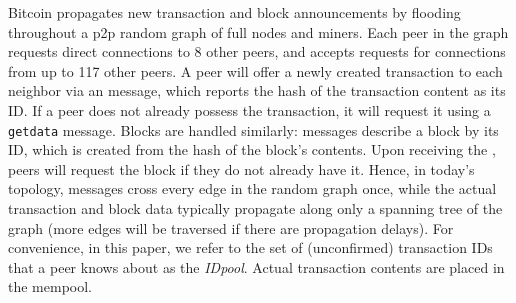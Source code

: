  Bitcoin propagates new transaction and
block announcements by flooding throughout a p2p random graph of full
nodes and miners. Each peer in the graph requests direct connections
to 8 other peers, and accepts requests for connections from up to 117
other peers. A peer will offer a newly created transaction to each
neighbor via an \inv message, which reports the hash of the
transaction content as its ID. If a peer does not already possess the
transaction, it will request it using a {\tt getdata} message. Blocks
are handled similarly: \inv messages describe a block by its ID, which
is created from the hash of the block's contents.  Upon receiving the
\inv, peers will request the block if they do not already have it.
Hence, in today's topology, \inv messages cross every edge in the
random graph once, while the actual transaction and block data
typically propagate along only a spanning tree of the graph (more
edges will be traversed if there are propagation delays).  For
convenience, in this paper, we refer to the set of (unconfirmed)
transaction IDs that a peer knows about as the {\em IDpool}. Actual
transaction contents are placed in the mempool.

